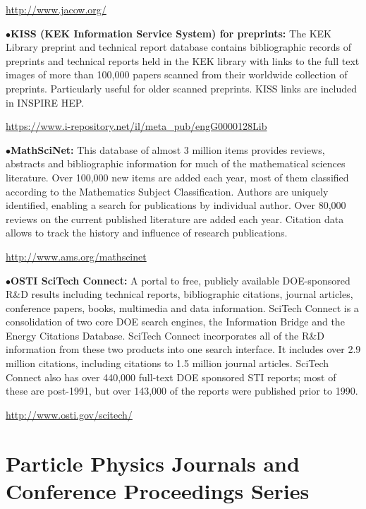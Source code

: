    \item{}\qquad\url{http://www.jacow.org/}
\medskip

\item{$\bullet$}{\bf KISS (KEK Information Service System) for preprints:}
The KEK Library preprint and technical report database contains bibliographic records of preprints and technical reports held in the KEK library with links to the full text images of more than 100,000 papers scanned from their worldwide collection of preprints. Particularly useful for older scanned preprints. KISS links are included in INSPIRE HEP.
   \item{}\qquad\url{https://www.i-repository.net/il/meta\_pub/engG0000128Lib}
\medskip

\item{$\bullet$}{\bf MathSciNet:}
This database of almost 3 million items provides reviews, abstracts and bibliographic information for much of the mathematical sciences literature. Over 100,000 new items are added each year, most of them classified according to the Mathematics Subject Classification. Authors are uniquely identified, enabling a search for publications by individual author. Over 80,000 reviews on the current published literature are added each year. Citation data allows to track the history and influence of research publications.
   \item{}\qquad\url{http://www.ams.org/mathscinet}
\medskip

\item{$\bullet$}{\bf OSTI SciTech Connect:}
A portal to free, publicly available DOE-sponsored R\&D results including technical reports, bibliographic citations, journal articles, conference papers, books, multimedia and data information. SciTech Connect is a consolidation of two core DOE search engines, the Information Bridge and the Energy Citations Database. SciTech Connect incorporates all of the R\&D information from these two products into one search interface. It includes over 2.9 million citations, including citations to 1.5 million journal articles. SciTech Connect also has over 440,000 full-text DOE sponsored STI reports; most of these are post-1991, but over 143,000 of the reports were published prior to 1990.

   \item{}\qquad\url{http://www.osti.gov/scitech/}
\medskip

\vglue -0.1in
\section{Particle Physics Journals and Conference Proceedings Series}%

